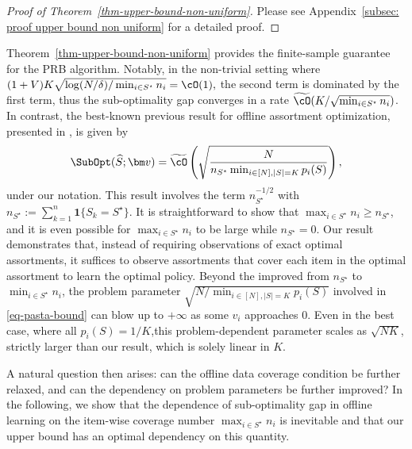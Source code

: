 \documentclass[10pt, letterpaper]{article}
\begin{document}
\begin{proof}[Proof of Theorem~\ref{thm-upper-bound-non-uniform}]
    Please see Appendix~\ref{subsec: proof upper bound non uniform} for a detailed proof.
\end{proof}

Theorem~\ref{thm-upper-bound-non-uniform} provides the finite-sample guarantee for the PRB algorithm. Notably, in the non-trivial setting where $(1+V)K\sqrt{\log(N/\delta)/\min_{i\in S^\star} n_i} =\cO(1),$ the second term is dominated by the first term, thus the sub-optimality gap converges in a rate $\widetilde{\cO}(K/\sqrt{\min_{i\in S^\star}n_i}) $. In contrast, the best-known previous result for offline assortment optimization, presented in \cite{dong2023pasta}, is given by \begin{align}\label{eq-pasta-bound}
   \SubOpt(\widehat{S};\bm v) =   \widetilde{\cO}\left(\sqrt{\frac{{N}}{n_{S^\star}\min_{i\in [N],\lvert S \rvert = K}  p_i(S)}}\right),
\end{align}
under our notation. This result involves the term $n_{S^\star}^{-1/2}$ with $n_{S^\star} := \sum_{k = 1}^n \bm{1}\{S_k = S^\star\}.$ It is straightforward to show that $\max_{i \in S^\star} n_i \geq n_{S^\star}$, and it is even possible for $\max_{i \in S^\star} n_i$ to be large while $n_{S^\star} = 0$. Our result demonstrates that, instead of requiring observations of exact optimal assortments, it suffices to observe assortments that cover each item in the optimal assortment to learn the optimal policy. Beyond the improved from $n_{S^\star}$ to $\min_{i\in S^\star} n_{i}$, the problem parameter $\sqrt{N/\min_{i\in [N],\lvert S\rvert = K} p_i(S)}$ involved in \eqref{eq-pasta-bound} can blow up to $+\infty$ as some $v_i$ approaches $0$. Even in the best case, where all $p_i(S) = 1/K$,this problem-dependent parameter scales as $\sqrt{NK}$, strictly larger than our result, which is solely linear in $K$.


A natural question then arises: can the offline data coverage condition be further relaxed, and can the dependency on problem parameters be further improved? In the following, we show that the dependence of sub-optimality gap in offline learning on the item-wise coverage number $\max_{i \in S^\star} n_i$ is inevitable and that our upper bound has an optimal dependency on this quantity. 
\end{document}
